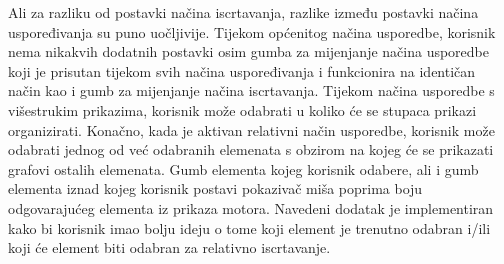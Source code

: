 \documentclass[times, utf8, diplomski]{fer}
\begin{document}
Ali za razliku od postavki načina iscrtavanja, razlike između postavki načina uspoređivanja su puno uočljivije. Tijekom općenitog načina usporedbe, korisnik nema nikakvih dodatnih postavki osim gumba za mijenjanje načina usporedbe koji je prisutan tijekom svih načina uspoređivanja i funkcionira na identičan način kao i gumb za mijenjanje načina iscrtavanja. Tijekom načina usporedbe s višestrukim prikazima, korisnik može odabrati u koliko će se stupaca prikazi organizirati. Konačno, kada je aktivan relativni način usporedbe, korisnik može odabrati jednog od već odabranih elemenata s obzirom na kojeg će se prikazati grafovi ostalih elemenata. Gumb elementa kojeg korisnik odabere, ali i gumb elementa iznad kojeg korisnik postavi pokazivač miša poprima boju odgovarajućeg elementa iz prikaza motora. Navedeni dodatak je implementiran kako bi korisnik imao bolju ideju o tome koji element je trenutno odabran i/ili koji će element biti odabran za relativno iscrtavanje.
\end{document}
